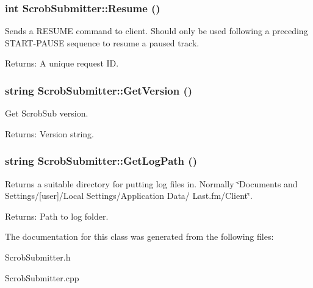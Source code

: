 \subsubsection{\setlength{\rightskip}{0pt plus 5cm}int ScrobSubmitter::Resume ()}\label{class_scrob_submitter_eaa7bc7179e4a6c76bbb2a8ca7030aaf}


Sends a RESUME command to client. Should only be used following a preceding START-PAUSE sequence to resume a paused track.

\begin{Desc}
\item[Returns:]A unique request ID. \end{Desc}
\subsubsection{\setlength{\rightskip}{0pt plus 5cm}string ScrobSubmitter::GetVersion ()}\label{class_scrob_submitter_22eaa73467e48cb23d69e4191b48c9e8}


Get ScrobSub version.

\begin{Desc}
\item[Returns:]Version string. \end{Desc}
\subsubsection{\setlength{\rightskip}{0pt plus 5cm}string ScrobSubmitter::GetLogPath ()\hspace{0.3cm}{\tt  [static]}}\label{class_scrob_submitter_2c86769b762ee18c647cd5a6645a579d}


Returns a suitable directory for putting log files in. Normally \char`\"{}Documents and Settings/[user]/Local Settings/Application Data/ Last.fm/Client\char`\"{}.

\begin{Desc}
\item[Returns:]Path to log folder. \end{Desc}


The documentation for this class was generated from the following files:\begin{CompactItemize}
\item 
ScrobSubmitter.h\item 
ScrobSubmitter.cpp\end{CompactItemize}
